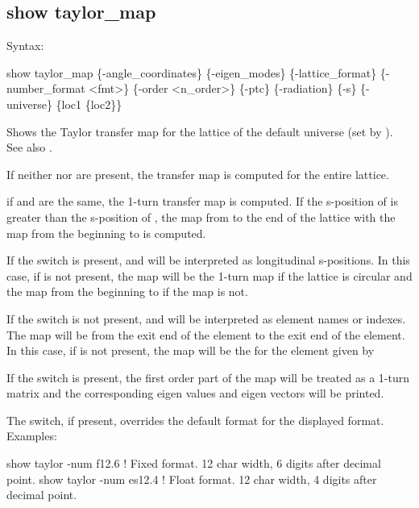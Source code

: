 {{{{{{{{{{%

\subsection{show taylor_map}
\label{s:show.taylor}

Syntax:
\begin{example}
  show taylor_map \{-angle_coordinates\} \{-eigen_modes\} \{-lattice_format\} 
            \{-number_format <fmt>\} \{-order <n_order>\} \{-ptc\} \{-radiation\}
            \{-s\} \{-universe\} \{loc1 \{loc2\}\}
\end{example}

Shows the Taylor transfer map for the  lattice of the default universe (set by
).  See also .

If neither  nor  are present, the transfer map is computed for the
entire lattice.

if  and  are the same, the 1-turn transfer map is computed. If the
s-position of  is greater than the s-position of , the map from
 to the end of the lattice with the map from the beginning to  is
computed.

If the  switch is present,  and  will be interpreted as longitudinal
s-positions. In this case, if  is not present, the map will be the 1-turn map if the
lattice is circular and the map from the beginning to  if the map is not.

If the  switch is not present,  and  will be interpreted as element names
or indexes. The map will be from the exit end of the  element to the exit end of the
 element. In this case, if  is not present, the map will be the for the element
given by 

If the  switch is present, the first order part of the map will be treated as a
1-turn matrix and the corresponding eigen values and eigen vectors will be printed.

The  switch, if present, overrides the default format for the displayed format.
Examples:
\begin{example}
  show taylor -num f12.6  ! Fixed format. 12 char width, 6 digits after decimal point.
  show taylor -num es12.4 ! Float format. 12 char width, 4 digits after decimal point.
\end{example}

}}}}}}}}}}
